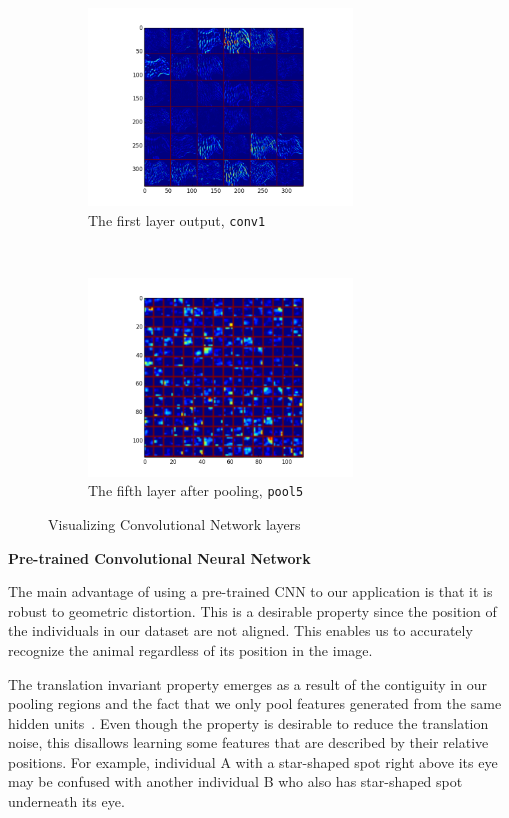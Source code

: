 \begin{figure}[htbp]
\begin{subfigure}[t]{0.45\textwidth}
      \centering
      \includegraphics[width=7cm]{preprocess/lastconv1}
      \caption{The first layer output, \texttt{conv1}}
  \end{subfigure}
  ~
  \begin{subfigure}[t]{0.45\textwidth}
      \centering
      \includegraphics[width=7cm]{preprocess/lastpool5}
      \caption{The fifth layer after pooling, \texttt{pool5}}
  \end{subfigure}
  \captionsetup{justification=centering}
  \caption{Visualizing Convolutional Network layers}
\end{figure}


\textbf{Pre-trained Convolutional Neural Network}

The main advantage of using a pre-trained CNN to our application is that it is
robust to geometric distortion. This is a desirable property since the position
of the individuals in our dataset are not aligned. This enables us to
accurately recognize the animal regardless of its position in the image. 

The translation invariant property emerges as a result of the contiguity in our
pooling regions and the fact that we only pool features generated from the same
hidden units~\cite{ufldl}. Even though the property is desirable to reduce the
translation noise, this disallows learning some features that are described by
their relative positions. For example, individual A with a star-shaped spot
right above its eye may be confused with another individual B who also has
star-shaped spot underneath its eye. 

